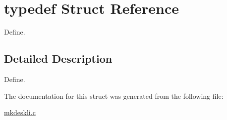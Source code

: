 \hypertarget{structtypedef}{\section{typedef Struct Reference}
\label{structtypedef}
}


Define.  




\subsection{Detailed Description}
Define. 

The documentation for this struct was generated from the following file\-:\begin{DoxyCompactItemize}
\item 
\hyperlink{mkdeskli_8c}{mkdeskli.\-c}\end{DoxyCompactItemize}
